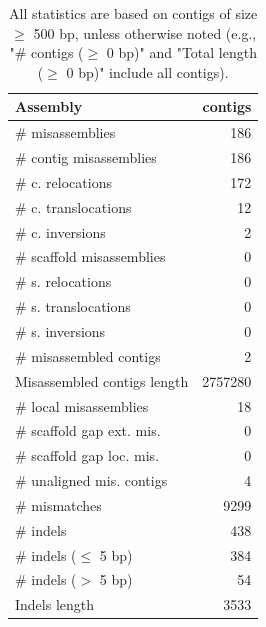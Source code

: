 \documentclass[12pt,a4paper]{article}
\begin{document}
\begin{table}[ht]
\begin{center}
\caption{All statistics are based on contigs of size $\geq$ 500 bp, unless otherwise noted (e.g., "\# contigs ($\geq$ 0 bp)" and "Total length ($\geq$ 0 bp)" include all contigs).}
\begin{tabular}{|l*{1}{|r}|}
\hline
Assembly & contigs \\ \hline
\# misassemblies & 186 \\ \hline
\hspace{2mm}\# contig misassemblies & 186 \\ \hline
\hspace{5mm}\# c. relocations & 172 \\ \hline
\hspace{5mm}\# c. translocations & 12 \\ \hline
\hspace{5mm}\# c. inversions & 2 \\ \hline
\hspace{2mm}\# scaffold misassemblies & 0 \\ \hline
\hspace{5mm}\# s. relocations & 0 \\ \hline
\hspace{5mm}\# s. translocations & 0 \\ \hline
\hspace{5mm}\# s. inversions & 0 \\ \hline
\# misassembled contigs & 2 \\ \hline
Misassembled contigs length & 2757280 \\ \hline
\# local misassemblies & 18 \\ \hline
\# scaffold gap ext. mis. & 0 \\ \hline
\# scaffold gap loc. mis. & 0 \\ \hline
\# unaligned mis. contigs & 4 \\ \hline
\# mismatches & 9299 \\ \hline
\# indels & 438 \\ \hline
\hspace{5mm}\# indels ($\leq$ 5 bp) & 384 \\ \hline
\hspace{5mm}\# indels ($>$ 5 bp) & 54 \\ \hline
Indels length & 3533 \\ \hline
\end{tabular}
\end{center}
\end{table}
\end{document}
